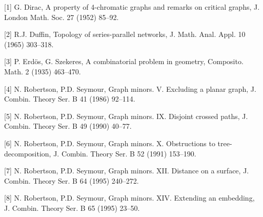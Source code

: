 [1] G. Dirac, A property of 4-chromatic graphs and remarks on critical graphs, J. London Math. Soc. 27 (1952) 85--92.

[2] R.J. Duffin, Topology of series-parallel networks, J. Math. Anal. Appl. 10 (1965) 303--318.

[3] P. Erd\"os, G. Szekeres, A combinatorial problem in geometry, Composito. Math. 2 (1935) 463--470.

[4] N. Robertson, P.D. Seymour, Graph minors. V. Excluding a planar graph, J. Combin. Theory Ser. B 41 (1986) 92--114.

[5] N. Robertson, P.D. Seymour, Graph minors. IX. Disjoint crossed paths, J. Combin. Theory Ser. B 49 (1990) 40--77.

[6] N. Robertson, P.D. Seymour, Graph minors. X. Obstructions to tree-decomposition, J. Combin. Theory Ser. B 52 (1991) 153--190.

[7] N. Robertson, P.D. Seymour, Graph minors. XII. Distance on a surface, J. Combin. Theory Ser. B 64 (1995) 240--272.

[8] N. Robertson, P.D. Seymour, Graph minors. XIV. Extending an embedding, J. Combin. Theory Ser. B 65 (1995) 23--50.
